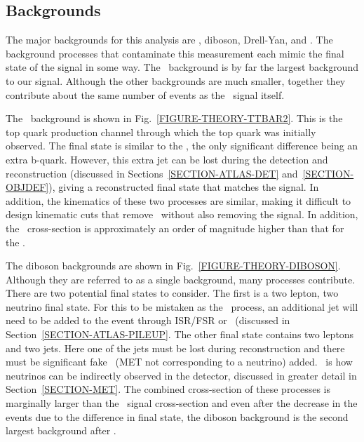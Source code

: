 

\subsection{Backgrounds}
\label{THEORY-BACKGROUND}
The major backgrounds for this analysis are \TTbar, diboson, Drell-Yan, and \multijet. The background processes that contaminate this measurement each mimic the final state of the signal in some way. The \ttbar\ background is by far the largest background to our signal. Although the other backgrounds are much smaller, together they contribute about the same number of events as the \Wtchan\ signal itself.

The \TTbar\ background is shown in Fig.~\ref{FIGURE-THEORY-TTBAR2}. This is the top quark production channel through which the top quark was initially observed. The final state is similar to the \Wtchan, the only significant difference being an extra b-quark. However, this extra jet can be lost during the detection and reconstruction (discussed in Sections~\ref{SECTION-ATLAS-DET} and~\ref{SECTION-OBJDEF}), giving a reconstructed final state that matches the signal. In addition, the kinematics of these two processes are similar, making it difficult to design kinematic cuts that remove \TTbar\ without also removing the signal. In addition, the \TTbar\ cross-section is approximately an order of magnitude higher than that for the \Wtchan. 


The diboson backgrounds are shown in Fig.~\ref{FIGURE-THEORY-DIBOSON}. Although they are referred to as a single background, many processes contribute. There are two potential final states to consider. The first is a two lepton, two neutrino final state. For this to be mistaken as the \Wtchan\ process, an additional jet will need to be added to the event through ISR/FSR or \pileup\ (discussed in Section~\ref{SECTION-ATLAS-PILEUP}. The other final state contains two leptons and two jets. Here one of the jets must be lost during reconstruction and there must be significant fake \MET\ (MET not corresponding to a neutrino) added. \MET\ is how neutrinos can be indirectly observed in the detector, discussed in greater detail in Section~\ref{SECTION-MET}. The combined cross-section of these processes is marginally larger than the \Wtchan\ signal cross-section and even after the decrease in the events due to the difference in final state, the diboson background is the second largest background after \ttbar.

